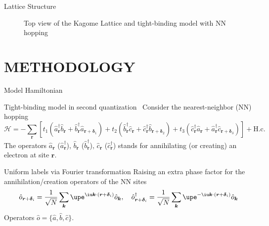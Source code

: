 \documentclass[svgnames, aspectratio = 1610]{beamer}
\begin{document}
\begin{frame}{Lattice Structure}
\begin{figure}[htbp]
\begin{minipage}[t]{.48\linewidth}
    \end{minipage}
    \caption{Top view of the Kagome Lattice and
      tight-binding model with NN hopping}
  \end{figure}
\end{frame}

\section{METHODOLOGY}

\begin{frame}{Model Hamiltonian}
  \begin{alertblock}{Tight-binding model in second
    quantization~\cite{PhysRevB.102.045151}}
    Consider the nearest-neighbor (NN) hopping
    \begin{equation}
      \mathcal H = -\sum_{\bm r}[
        t_1(\hat a_{\bm r}^\dagger \hat b_{\bm r}
        + \hat b_{\bm r}^\dagger \hat a_{\bm r+\bm\delta_1})
        + t_2(\hat b_{\bm r}^\dagger \hat c_{\bm r}
        + \hat c_{\bm r}^\dagger \hat b_{\bm r+\bm\delta_2})
        + t_3(\hat c_{\bm r}^\dagger \hat a_{\bm r}
        + \hat a_{\bm r}^\dagger \hat c_{\bm r+\bm\delta_3})]
        + \text{H.c.}
      \label{eq:Hamiltonian_NN}
    \end{equation}
    The operators $\hat a_{\bm r}$ ($\hat a_{\bm r}^\dagger$),
    $\hat b_{\bm r}$ ($\hat b_{\bm r}^\dagger$),
    $\hat c_{\bm r}$ ($\hat c_{\bm r}^\dagger$)
    stands for annihilating (or creating) an electron at site $\bm r$.
  \end{alertblock}
  \pause
  \begin{block}{Uniform labels via Fourier transformation}
    Raising an extra phase factor for the annihilation/creation operators of
    the NN sites
    \[
      \hat o_{\bm r+\bm\delta_i} = \frac1{\sqrt N} \sum_{\bm k}
        \upe^{\iu\bm k\cdot(\bm r+\bm\delta_i)} \hat o_{\bm k}, \quad
      \hat o_{\bm r+\bm\delta_i}^\dagger = \frac1{\sqrt N} \sum_{\bm k}
        \upe^{-\iu\bm k\cdot(\bm r+\bm\delta_i)} \hat o_{\bm k}
    \]
    Operators $\hat o = \{\hat a, \hat b, \hat c\}$.
  \end{block}
\end{frame}
\end{document}
